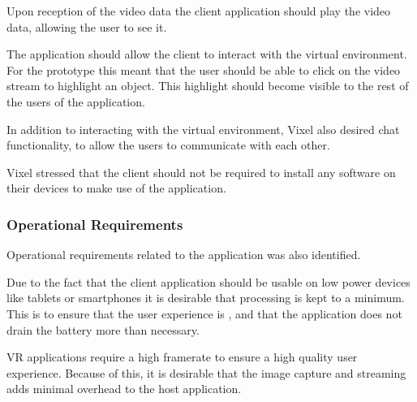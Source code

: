 Upon reception of the video data the client application should play the video data, allowing the user to see it. 

The application should allow the client to interact with the virtual environment. For the prototype this meant that the user should be able to click on the video stream to highlight an object. This highlight should become visible to the rest of the users of the application.

In addition to interacting with the virtual environment, Vixel also desired chat functionality, to allow the users to communicate with each other.

Vixel stressed that the client should not be required to install any software on their devices to make use of the application. 

\subsubsection{Operational Requirements}
Operational requirements related to the application was also identified.

Due to the fact that the client application should be usable on low power devices like tablets or smartphones it is desirable that processing is kept to a minimum. This is to ensure that the user experience is , and that the application does not drain the battery more than necessary.

VR applications require a high framerate to ensure a high quality user experience. Because of this, it is desirable that the image capture and streaming adds minimal overhead to the host application.

